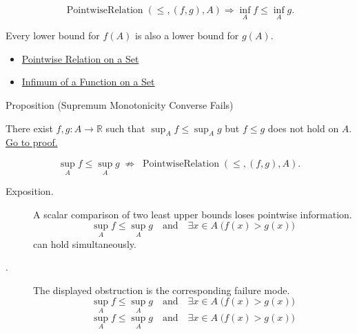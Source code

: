 \begin{remark*}
\[
  \operatorname{PointwiseRelation}(\leq,(f,g),A)
  \Rightarrow
  \inf_A f\leq \inf_A g.
\]
\end{remark*}

\begin{remark*}[Interpretation]
Every lower bound for \(f(A)\) is also a lower bound for \(g(A)\).
\end{remark*}

\begin{dependencies}
\begin{itemize}
  \item \hyperref[def:pointwise-relation-on-set]{Pointwise Relation on a Set}
  \item \hyperref[def:function-infimum-on-set]{Infimum of a Function on a Set}
\end{itemize}
\end{dependencies}

\begin{propositionbox}{Proposition (Supremum Monotonicity Converse Fails)}
\begin{proposition}
\label{prop:supremum-monotonicity-converse-fails}
There exist \(f,g:A\to\mathbb{R}\) such that \(\sup_A f\leq\sup_A g\) but
\(f\leq g\) does not hold on \(A\).
\hyperref[prf:supremum-monotonicity-converse-fails]{Go to proof.}
\end{proposition}
\end{propositionbox}

\begin{remark*}
\[
  \sup_A f\leq\sup_A g
  \;\not\Longrightarrow\;
  \operatorname{PointwiseRelation}(\leq,(f,g),A).
\]
\end{remark*}

\begin{remark*}
\begin{description}
  \item[Exposition.]
A scalar comparison of two least upper bounds loses pointwise information.
\[
  \sup_A f\leq\sup_A g
  \quad\text{and}\quad
  \exists x\in A\;\bigl(f(x)>g(x)\bigr)
\]
can hold simultaneously.


  \item[\exists{}.]
  The displayed obstruction is the corresponding failure mode.
  \[
  \sup_A f\leq\sup_A g
  \quad\text{and}\quad
  \exists x\in A\;\bigl(f(x)>g(x)\bigr)
\]
  \[
  \sup_A f\leq\sup_A g
  \quad\text{and}\quad
  \exists x\in A\;\bigl(f(x)>g(x)\bigr)
\]
\end{description}
\end{remark*}

